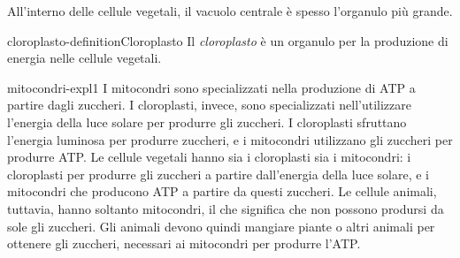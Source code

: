 \documentclass[preview]{standalone}
\begin{document}
\begin{plainhtml}
    All'interno delle cellule vegetali, il vacuolo centrale è spesso l'organulo più grande.
\end{plainhtml}

\begin{snippetdefinition}{cloroplasto-definition}{Cloroplasto}
    Il \textit{cloroplasto} è un organulo per la produzione di
    energia nelle cellule vegetali.
\end{snippetdefinition}

\begin{snippet}{mitocondri-expl1}
    I mitocondri sono specializzati nella
    produzione di ATP a partire dagli zuccheri. I cloroplasti, invece, sono specializzati
    nell'utilizzare l'energia della luce solare per produrre gli zuccheri.
    I cloroplasti sfruttano l'energia luminosa per produrre zuccheri, e i mitocondri
    utilizzano gli zuccheri per produrre ATP. Le cellule vegetali hanno sia i cloroplasti sia i
    mitocondri: i cloroplasti per produrre gli zuccheri a partire dall'energia della luce solare, e i
    mitocondri che producono ATP a partire da questi zuccheri. Le cellule animali, tuttavia,
    hanno soltanto mitocondri, il che significa che non possono prodursi da sole gli zuccheri. Gli
    animali devono quindi mangiare piante o altri animali per ottenere gli zuccheri, necessari ai
    mitocondri per produrre l'ATP.
\end{snippet}


\end{document}
